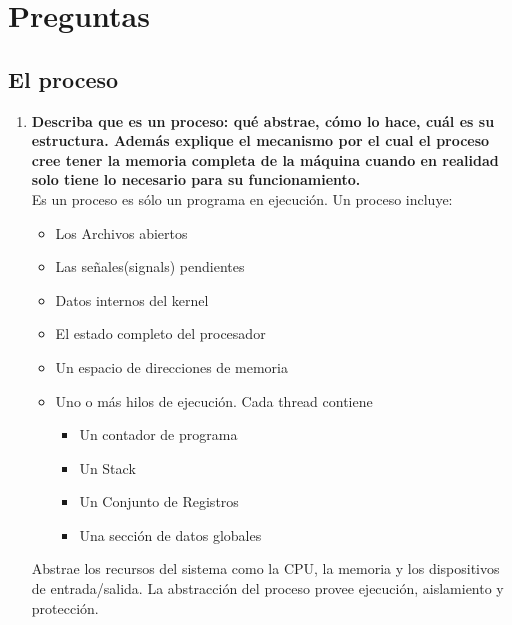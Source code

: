 \documentclass[../main.tex]{subfiles}
\begin{document}

\section{Preguntas}
    \subsection*{El proceso}
        \begin{enumerate}
            \item \textbf{Describa que es un proceso: qué abstrae, cómo lo hace, cuál es su estructura. Además explique el mecanismo por el cual el proceso cree tener la memoria completa de la máquina cuando en realidad solo tiene lo necesario para su funcionamiento.}\\
                Es un proceso es sólo un programa en ejecución. Un proceso incluye:
                \begin{itemize}
                    \item Los Archivos abiertos
                    \item Las señales(signals) pendientes
                    \item Datos internos del kernel
                    \item El estado completo del procesador
                    \item Un espacio de direcciones de memoria
                    \item Uno o más hilos de ejecución. Cada thread contiene
                    \begin{itemize}
                        \item Un contador de programa
                        \item Un Stack
                        \item Un Conjunto de Registros
                        \item Una sección de datos globales
                    \end{itemize}
                \end{itemize}

                Abstrae los recursos del sistema como la CPU, la memoria y los dispositivos de entrada/salida. La abstracción del proceso provee ejecución, aislamiento y protección.


\end{enumerate}
\end{document}

